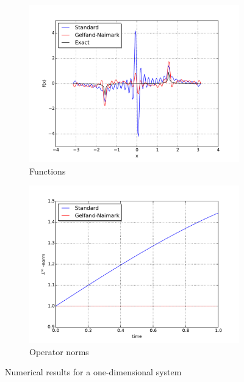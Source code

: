 \documentclass[12pt]{amsart}
\begin{document}
\begin{figure}[h!]
	\centering
	\begin{subfigure}{0.4\textwidth}
		\includegraphics[width=\textwidth]{./images/function_comparison.pdf}
		\caption{Functions}
		\label{fig:function}
	\end{subfigure}
	\begin{subfigure}{0.4\textwidth}
		\includegraphics[width=\textwidth]{./images/L_inf_plot.pdf}
		\caption{Operator norms}
		\label{fig:sup norm}
	\end{subfigure}
	\caption{Numerical results for a one-dimensional system}
\end{figure}
\end{document}
